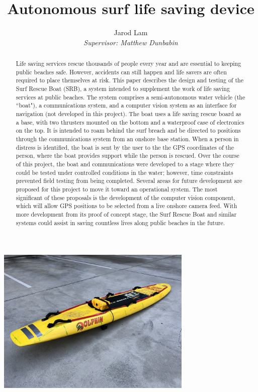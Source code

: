 \documentclass[a4paper]{IEEEtran}
\title{\vspace{5.0cm}Autonomous surf life saving device}
\author{\Large Jarod Lam\\ \textit{Supervisor: Matthew Dunbabin}}
\begin{document}
\begin{minipage}{\textwidth}
\vfill
\maketitle
\begin{minipage}{\textwidth}
\centering
\includegraphics[width=0.7\textwidth]{boat-overview.jpg}
\end{minipage}
\vfill
\end{minipage}
\clearpage

\begin{abstract}
Life saving services rescue thousands of people every year and are essential to keeping public beaches safe. However, accidents can still happen and life savers are often required to place themselves at risk. This paper describes the design and testing of the Surf Rescue Boat (SRB), a system intended to supplement the work of life saving services at public beaches. The system comprises a semi-autonomous water vehicle (the ``boat"), a communications system, and a computer vision system as an interface for navigation (not developed in this project). The boat uses a life saving rescue board as a base, with two thrusters mounted on the bottom and a waterproof case of electronics on the top. It is intended to roam behind the surf breach and be directed to positions through the communications system from an onshore base station. When a person in distress is identified, the boat is sent by the user to the the GPS coordinates of the person, where the boat provides support while the person is rescued. Over the course of this project, the boat and communications were developed to a stage where they could be tested under controlled conditions in the water; however, time constraints prevented field testing from being completed. Several areas for future development are proposed for this project to move it toward an operational system. The most significant of these proposals is the development of the computer vision component, which will allow GPS positions to be selected from a live onshore camera feed. With more development from its proof of concept stage, the Surf Rescue Boat and similar systems could assist in saving countless lives along public beaches in the future.
\end{abstract}
\end{document}
